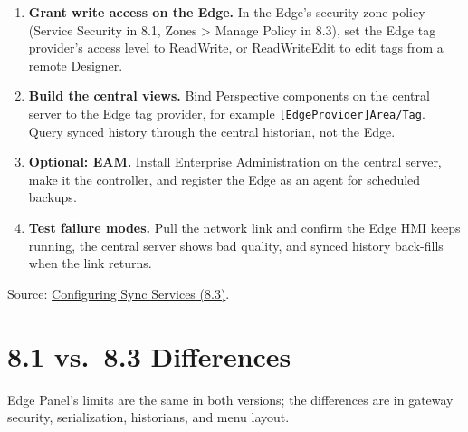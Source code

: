 \begin{enumerate}[itemsep=2pt]
  \item \textbf{Grant write access on the Edge.} In the Edge's security zone policy (Service Security in 8.1, Zones \textgreater{} Manage Policy in 8.3), set the Edge tag provider's access level to ReadWrite, or ReadWriteEdit to edit tags from a remote Designer.
  \item \textbf{Build the central views.} Bind Perspective components on the central server to the Edge tag provider, for example \texttt{[EdgeProvider]\allowbreak{}Area/\allowbreak{}Tag}. Query synced history through the central historian, not the Edge.
  \item \textbf{Optional: EAM.} Install Enterprise Administration on the central server, make it the controller, and register the Edge as an agent for scheduled backups.
  \item \textbf{Test failure modes.} Pull the network link and confirm the Edge HMI keeps running, the central server shows bad quality, and synced history back-fills when the link returns.
\end{enumerate}
Source: \href{https://www.docs.inductiveautomation.com/docs/8.3/other-editions/ignition-edge/edge-gateway/configuring-sync-services}{Configuring Sync Services (8.3)}.

\section{8.1 vs.\ 8.3 Differences}
Edge Panel's limits are the same in both versions; the differences are in gateway security, serialization, historians, and menu layout.

